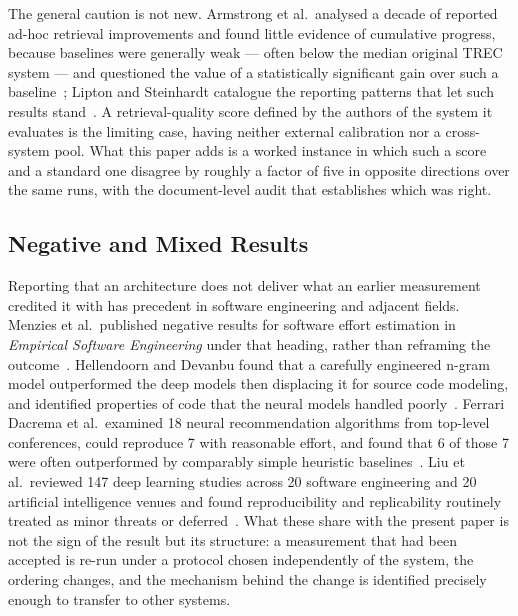 The general caution is not new. Armstrong et al.\ analysed a decade of reported
ad-hoc retrieval improvements and found little evidence of cumulative progress,
because baselines were generally weak --- often below the median original TREC
system --- and questioned the value of a statistically significant gain over such
a baseline~\cite{armstrong2009improvements}; Lipton and Steinhardt catalogue the
reporting patterns that let such results stand~\cite{lipton2019trends}. A
retrieval-quality score defined by the authors of the system it evaluates is the
limiting case, having neither external calibration nor a cross-system pool. What
this paper adds is a worked instance in which such a score and a standard one
disagree by roughly a factor of five in opposite directions over the same runs,
with the document-level audit that establishes which was right.

\subsection{Negative and Mixed Results}

Reporting that an architecture does not deliver what an earlier measurement
credited it with has precedent in software engineering and adjacent fields.
Menzies et al.\ published negative results for software effort estimation in
\emph{Empirical Software Engineering} under that heading, rather than reframing
the outcome~\cite{menzies2017negative}. Hellendoorn and Devanbu found that a
carefully engineered n-gram model outperformed the deep models then displacing
it for source code modeling, and identified properties of code that the neural
models handled poorly~\cite{hellendoorn2017dnn}. Ferrari Dacrema et al.\
examined 18 neural recommendation algorithms from top-level conferences, could
reproduce 7 with reasonable effort, and found that 6 of those 7 were often
outperformed by comparably simple heuristic
baselines~\cite{dacrema2019progress}. Liu et al.\ reviewed 147 deep learning
studies across 20 software engineering and 20 artificial intelligence venues and
found reproducibility and replicability routinely treated as minor threats or
deferred~\cite{liu2021reproducibility}. What these share with the present paper
is not the sign of the result but its structure: a measurement that had been
accepted is re-run under a protocol chosen independently of the system, the
ordering changes, and the mechanism behind the change is identified precisely
enough to transfer to other systems.
